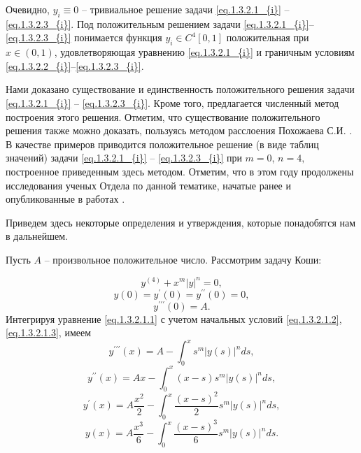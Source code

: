 Очевидно, $y_i \equiv 0$ -- тривиальное решение задачи \eqref{eq.1.3.2.1_{i}} -- \eqref{eq.1.3.2.3_{i}}.
Под положительным решением задачи \eqref{eq.1.3.2.1_{i}}--\eqref{eq.1.3.2.3_{i}} понимается функция
$y_i \in C^4[0,1]$   положительная при $x\in (0,1)$, удовлетворяющая
уравнению \eqref{eq.1.3.2.1_{i}} и граничным условиям \eqref{eq.1.3.2.2_{i}}--\eqref{eq.1.3.2.3_{i}}.

Нами доказано существование и единственность положительного решения
задачи \eqref{eq.1.3.2.1_{i}} -- \eqref{eq.1.3.2.3_{i}}. Кроме того, предлагается численный метод построения этого
решения. Отметим, что существование положительного решения также можно доказать,
пользуясь методом  расслоения Похожаева С.И. \cite{pohojVariaz}. В качестве примеров приводится
положительное решение (в виде таблиц значений) задачи \eqref{eq.1.3.2.1_{i}} -- \eqref{eq.1.3.2.3_{i}} при
$m=0$, $n=4,$  построенное приведенным здесь методом.
Отметим, что в этом году продолжены исследования ученых Отдела по данной тематике, начатые ранее и опубликованные в работах \cite{abdurag1,abdurag2,abdurag3,abdurag4}.

Приведем здесь некоторые определения и утверждения, которые понадобятся нам в дальнейшем.


Пусть $A$ -- произвольное положительное число. Рассмотрим задачу Коши:

\begin{equation}\label{eq.1.3.2.1.1}
    y^{(4)}+x^m{\vert y\vert}^n=0,
\end{equation}
\begin{equation}\label{eq.1.3.2.1.2}
   y(0)=y^{\prime}(0)=y^{\prime\prime}(0)=0,
\end{equation}
\begin{equation}\label{eq.1.3.2.1.3}
         y^{\prime\prime\prime}(0)=A.
\end{equation}
Интегрируя уравнение \eqref{eq.1.3.2.1.1} с учетом начальных условий \eqref{eq.1.3.2.1.2}, \eqref{eq.1.3.2.1.3}, имеем
\begin{equation}\label{eq.1.3.2.1.4}
y^{\prime\prime\prime}(x)=A-\int_0^xs^m{\vert y(s)\vert}^n ds,
\end{equation}
\begin{equation}\label{eq.1.3.2.1.5}
y^{\prime\prime}(x)=Ax-\int_0^x(x-s)s^m{\vert y(s)\vert}^n ds,
\end{equation}
\begin{equation}\label{eq.1.3.2.1.6}
y^{\prime}(x)=
A\frac{x^2}{2}-\int_0^x\frac{(x-s)^2}{2}s^m{\vert y(s)\vert}^n ds,
\end{equation}
\begin{equation}\label{eq.1.3.2.1.7}
y(x)=
A\frac{x^3}{6}-\int_0^x\frac{(x-s)^3}{6}s^m{\vert y(s)\vert}^n ds.
\end{equation}

